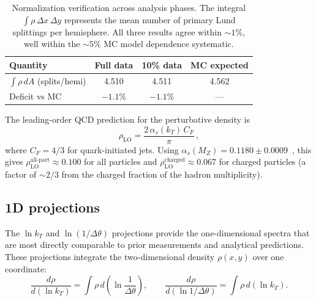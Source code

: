 \documentclass[11pt,a4paper]{article}
\begin{document}
\begin{table}[htbp]
\centering
\caption{Normalization verification across analysis phases.  The integral
  $\int \rho\,\Delta x\,\Delta y$ represents the mean number of primary
  Lund splittings per hemisphere.  All three results agree within
  $\sim\!1\%$, well within the $\sim\!5\%$ MC model dependence systematic.}
\label{tbl:normalization}
\begin{tabular}{lccc}
\toprule
Quantity & Full data & 10\% data & MC expected \\
\midrule
$\int \rho\,dA$ (splits/hemi) & 4.510 & 4.511 & 4.562 \\
Deficit vs MC & $-1.1\%$ & $-1.1\%$ & --- \\
\bottomrule
\end{tabular}
\end{table}

The leading-order QCD prediction for the perturbative density
is~\cite{Dreyer:2018nbf}
\begin{equation}
  \rho_\text{LO} = \frac{2\,\alpha_s(k_T)\,C_F}{\pi}\,,
  \label{eq:rho-lo}
\end{equation}
where $C_F = 4/3$ for quark-initiated jets.  Using
$\alpha_s(M_Z) = 0.1180 \pm 0.0009$~\cite{ParticleDataGroup:2024cfk},
this gives $\rho_\text{LO}^\text{all-part} \approx 0.100$ for all
particles and $\rho_\text{LO}^\text{charged} \approx 0.067$ for charged
particles (a factor of $\sim\!2/3$ from the charged fraction of the
hadron multiplicity).

\subsection{1D projections}
\label{sec:results-1d}

The $\ln k_T$ and $\ln(1/\Delta\theta)$ projections provide the
one-dimensional spectra that are most directly comparable to prior
measurements and analytical predictions.  These projections integrate
the two-dimensional density $\rho(x,y)$ over one coordinate:
\begin{equation}
  \frac{d\rho}{d(\ln k_T)} = \int \rho\,d\!\left(\ln\frac{1}{\Delta\theta}\right),
  \qquad
  \frac{d\rho}{d(\ln 1/\Delta\theta)} = \int \rho\,d(\ln k_T).
\end{equation}
\end{document}
